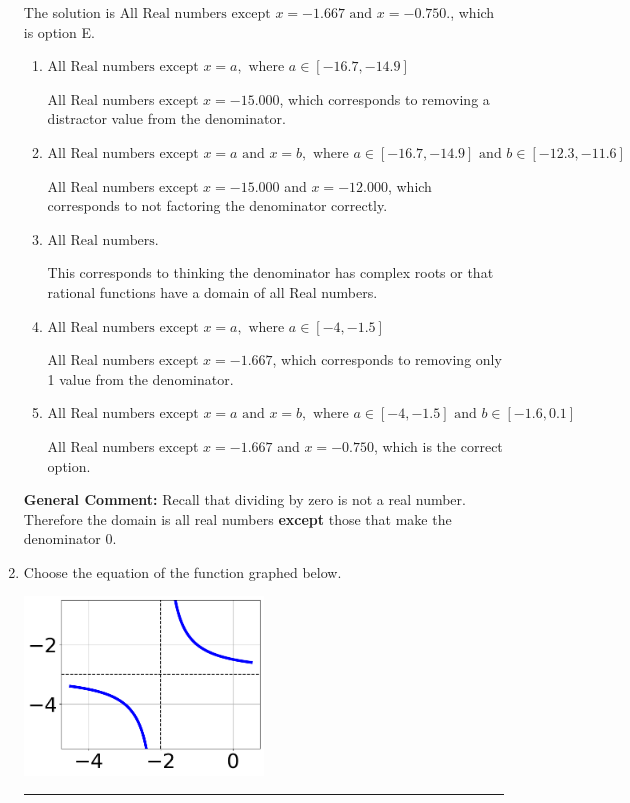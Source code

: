 \documentclass{extbook}[14pt]
\newcommand{\litem}[1]{\item #1

\rule{\textwidth}{0.4pt}}
\begin{document}
\begin{enumerate}
{The solution is \( \text{All Real numbers except } x = -1.667 \text{ and } x = -0.750. \), which is option E.\begin{enumerate}[label=\Alph*.]
\item \( \text{All Real numbers except } x = a, \text{ where } a \in [-16.7, -14.9] \)

All Real numbers except $x = -15.000$, which corresponds to removing a distractor value from the denominator.
\item \( \text{All Real numbers except } x = a \text{ and } x = b, \text{ where } a \in [-16.7, -14.9] \text{ and } b \in [-12.3, -11.6] \)

All Real numbers except $x = -15.000$ and $x = -12.000$, which corresponds to not factoring the denominator correctly.
\item \( \text{All Real numbers.} \)

This corresponds to thinking the denominator has complex roots or that rational functions have a domain of all Real numbers.
\item \( \text{All Real numbers except } x = a, \text{ where } a \in [-4, -1.5] \)

All Real numbers except $x = -1.667$, which corresponds to removing only 1 value from the denominator.
\item \( \text{All Real numbers except } x = a \text{ and } x = b, \text{ where } a \in [-4, -1.5] \text{ and } b \in [-1.6, 0.1] \)

All Real numbers except $x = -1.667$ and $x = -0.750$, which is the correct option.
\end{enumerate}

\textbf{General Comment:} Recall that dividing by zero is not a real number. Therefore the domain is all real numbers \textbf{except} those that make the denominator 0.
}
\litem{
Choose the equation of the function graphed below.

\begin{center}
    \includegraphics[width=0.5\textwidth]{../Figures/rationalGraphToEquationCopyA.png}
\end{center}




}
\end{enumerate}
\end{document}
